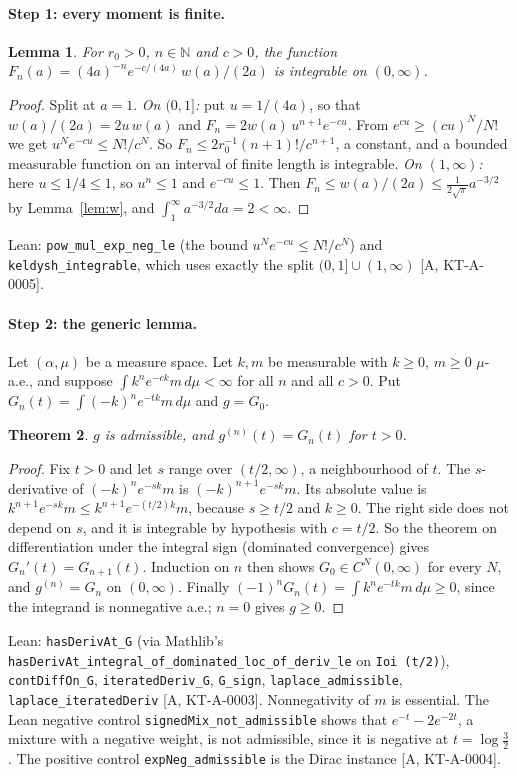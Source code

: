 \documentclass[11pt]{article}
\newtheorem{theorem}{Theorem}
\newtheorem{lemma}[theorem]{Lemma}
\theoremstyle{remark}
\newcommand{\tier}[1]{\textsf{[#1]}}
\newcommand{\lean}[1]{\texttt{#1}}
\begin{document}
\paragraph{Step 1: every moment is finite.}
\begin{lemma}\label{lem:mom}
For $r_0>0$, $n\in\mathbb N$ and $c>0$, the function
$F_n(a)=(4a)^{-n}e^{-c/(4a)}\,w(a)/(2a)$ is integrable on $(0,\infty)$.
\end{lemma}
\begin{proof}
Split at $a=1$. \emph{On $(0,1]$:} put $u=1/(4a)$, so that $w(a)/(2a)=2u\,w(a)$ and
$F_n=2w(a)\,u^{n+1}e^{-cu}$. From $e^{cu}\ge (cu)^N/N!$ we get $u^Ne^{-cu}\le N!/c^N$. So
$F_n\le 2r_0^{-1}(n+1)!/c^{n+1}$, a constant, and a bounded measurable function on an interval of finite length is
integrable. \emph{On $(1,\infty)$:} here $u\le 1/4\le1$, so $u^n\le1$ and $e^{-cu}\le1$. Then
$F_n\le w(a)/(2a)\le \frac{1}{2\sqrt\pi}a^{-3/2}$ by Lemma~\ref{lem:w}, and $\int_1^\infty a^{-3/2}da=2<\infty$.
\end{proof}
\noindent Lean: \lean{pow\_mul\_exp\_neg\_le} (the bound $u^Ne^{-cu}\le N!/c^N$) and \lean{keldysh\_integrable}, which
uses exactly the split $(0,1]\cup(1,\infty)$ \tier{A, KT-A-0005}.

\paragraph{Step 2: the generic lemma.} Let $(\alpha,\mu)$ be a measure space. Let $k,m$ be measurable with $k\ge0$,
$m\ge0$ $\mu$-a.e., and suppose $\int k^ne^{-ck}m\,d\mu<\infty$ for all $n$ and all $c>0$. Put
$G_n(t)=\int(-k)^ne^{-tk}m\,d\mu$ and $g=G_0$.
\begin{theorem}\label{thm:generic}
$g$ is admissible, and $g^{(n)}(t)=G_n(t)$ for $t>0$.
\end{theorem}
\begin{proof}
Fix $t>0$ and let $s$ range over $(t/2,\infty)$, a neighbourhood of $t$. The $s$-derivative of
$(-k)^ne^{-sk}m$ is $(-k)^{n+1}e^{-sk}m$. Its absolute value is $k^{n+1}e^{-sk}m\le k^{n+1}e^{-(t/2)k}m$, because
$s\ge t/2$ and $k\ge0$. The right side does not depend on $s$, and it is integrable by hypothesis with $c=t/2$. So the
theorem on differentiation under the integral sign (dominated convergence) gives $G_n'(t)=G_{n+1}(t)$. Induction on
$n$ then shows $G_0\in C^N(0,\infty)$ for every $N$, and $g^{(n)}=G_n$ on $(0,\infty)$. Finally
$(-1)^nG_n(t)=\int k^ne^{-tk}m\,d\mu\ge0$, since the integrand is nonnegative a.e.; $n=0$ gives $g\ge0$.
\end{proof}
\noindent Lean: \lean{hasDerivAt\_G} (via Mathlib's \lean{hasDerivAt\_integral\_of\_dominated\_loc\_of\_deriv\_le} on
\lean{Ioi (t/2)}), \lean{contDiffOn\_G}, \lean{iteratedDeriv\_G}, \lean{G\_sign}, \lean{laplace\_admissible},
\lean{laplace\_iteratedDeriv} \tier{A, KT-A-0003}. Nonnegativity of $m$ is essential. The Lean negative control
\lean{signedMix\_not\_admissible} shows that $e^{-t}-2e^{-2t}$, a mixture with a negative weight, is not admissible,
since it is negative at $t=\log\frac32$. The positive control \lean{expNeg\_admissible} is the Dirac instance
\tier{A, KT-A-0004}.
\end{document}
